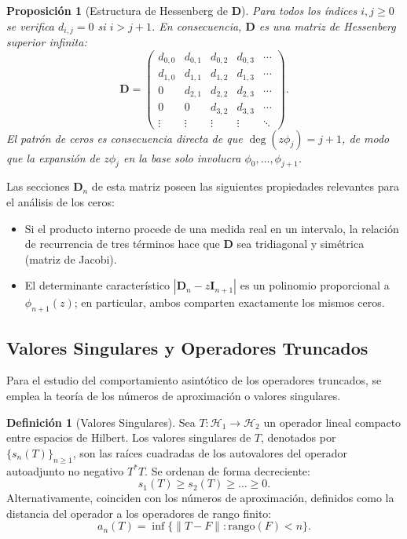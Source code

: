 \documentclass[12pt,a4paper]{article}
\newtheorem{proposition}{Proposición}
\theoremstyle{definition}
\newtheorem{definition}{Definición}
\theoremstyle{remark}
\begin{document}
\begin{proposition}[Estructura de Hessenberg de $\mathbf{D}$]\label{prop:hessenberg}
	Para todos los índices $i, j \geq 0$ se verifica $d_{i,j} = 0$ si $i > j+1$. En consecuencia, $\mathbf{D}$ es una matriz de Hessenberg superior infinita:
	\[
		\mathbf{D} = \begin{pmatrix}
			d_{0,0} & d_{0,1} & d_{0,2} & d_{0,3} & \cdots \\
			d_{1,0} & d_{1,1} & d_{1,2} & d_{1,3} & \cdots \\
			0       & d_{2,1} & d_{2,2} & d_{2,3} & \cdots \\
			0       & 0       & d_{3,2} & d_{3,3} & \cdots \\
			\vdots  & \vdots  & \vdots  & \vdots  & \ddots
		\end{pmatrix}.
	\]
	El patrón de ceros es consecuencia directa de que $\deg(z\phi_j) = j+1$, de modo que la expansión de $z\phi_j$ en la base solo involucra $\phi_0, \dots, \phi_{j+1}$.
\end{proposition}

Las secciones $\mathbf{D}_n$ de esta matriz poseen las siguientes propiedades relevantes para el análisis de los ceros:

\begin{itemize}
	\item Si el producto interno procede de una medida real en un intervalo, la relación de recurrencia de tres términos hace que $\mathbf{D}$ sea tridiagonal y simétrica (matriz de Jacobi).
	\item El determinante característico $|\mathbf{D}_n - z\mathbf{I}_{n+1}|$ es un polinomio proporcional a $\phi_{n+1}(z)$; en particular, ambos comparten exactamente los mismos ceros.
\end{itemize}

\subsection{Valores Singulares y Operadores Truncados}

Para el estudio del comportamiento asintótico de los operadores truncados, se emplea la teoría de los números de aproximación o valores singulares.

\begin{definition}[Valores Singulares]
	Sea $T: \mathcal{H}_1 \to \mathcal{H}_2$ un operador lineal compacto entre espacios de Hilbert. Los valores singulares de $T$, denotados por $\{s_n(T)\}_{n \geq 1}$, son las raíces cuadradas de los autovalores del operador autoadjunto no negativo $T^*T$. Se ordenan de forma decreciente:
	\begin{equation}
		s_1(T) \geq s_2(T) \geq \dots \geq 0.
	\end{equation}
	Alternativamente, coinciden con los números de aproximación, definidos como la distancia del operador a los operadores de rango finito:
	\begin{equation}
		a_n(T) = \inf \{ \|T - F\| : \text{rango}(F) < n \}.
	\end{equation}
\end{definition}
\end{document}
